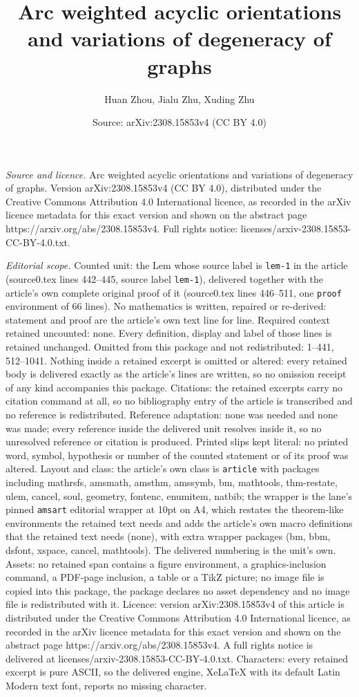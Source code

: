 \documentclass[10pt,a4paper]{amsart}
\title[Arc weighted acyclic orientations and variations of degenera]{Arc weighted acyclic orientations and variations of degeneracy of graphs}
\author{Huan Zhou, Jialu Zhu, Xuding Zhu}
\date{Source: arXiv:2308.15853v4 (CC BY 4.0)}
\begin{document}
\maketitle

\noindent\emph{Source and licence.} Arc weighted acyclic orientations and variations of degeneracy of graphs. Version arXiv:2308.15853v4 (CC BY 4.0), distributed under the Creative Commons Attribution 4.0 International licence, as recorded in the arXiv licence metadata for this exact version and shown on the abstract page https://arxiv.org/abs/2308.15853v4. Full rights notice: licenses/arxiv-2308.15853-CC-BY-4.0.txt.\par\smallskip

\noindent\textit{Editorial scope.} Counted unit: the Lem whose source label is \texttt{lem-1} in the article (source0.tex lines 442--445, source label \texttt{lem-1}), delivered together with the article's own complete original proof of it (source0.tex lines 446--511, one \texttt{proof} environment of 66 lines). No mathematics is written, repaired or re-derived: statement and proof are the article's own text line for line. Required context retained uncounted: none. Every definition, display and label of those lines is retained unchanged. Omitted from this package and not redistributed: 1--441, 512--1041. Nothing inside a retained excerpt is omitted or altered: every retained body is delivered exactly as the article's lines are written, so no omission receipt of any kind accompanies this package. Citations: the retained excerpts carry no citation command at all, so no bibliography entry of the article is transcribed and no reference is redistributed. Reference adaptation: none was needed and none was made; every reference inside the delivered unit resolves inside it, so no unresolved reference or citation is produced. Printed slips kept literal: no printed word, symbol, hypothesis or number of the counted statement or of its proof was altered. Layout and class: the article's own class is \texttt{article} with packages including mathrsfs, amsmath, amsthm, amssymb, bm, mathtools, thm-restate, ulem, cancel, soul, geometry, fontenc, enumitem, natbib; the wrapper is the lane's pinned \texttt{amsart} editorial wrapper at 10pt on A4, which restates the theorem-like environments the retained text needs and adds the article's own macro definitions that the retained text needs (none), with extra wrapper packages (bm, bbm, dsfont, xspace, cancel, mathtools). The delivered numbering is the unit's own. Assets: no retained span contains a figure environment, a graphics-inclusion command, a PDF-page inclusion, a table or a TikZ picture; no image file is copied into this package, the package declares no asset dependency and no image file is redistributed with it. Licence: version arXiv:2308.15853v4 of this article is distributed under the Creative Commons Attribution 4.0 International licence, as recorded in the arXiv licence metadata for this exact version and shown on the abstract page https://arxiv.org/abs/2308.15853v4. A full rights notice is delivered at licenses/arxiv-2308.15853-CC-BY-4.0.txt. Characters: every retained excerpt is pure ASCII, so the delivered engine, XeLaTeX with its default Latin Modern text font, reports no missing character.
\end{document}
